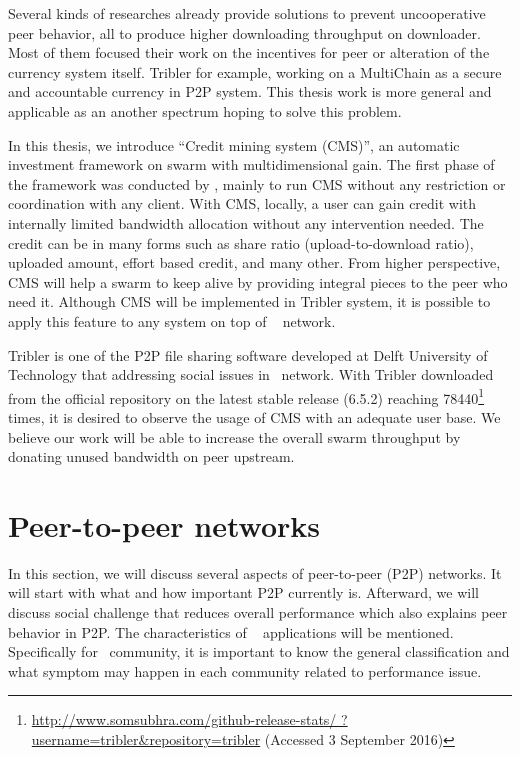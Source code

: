 Several kinds of researches already provide solutions to prevent uncooperative peer behavior, all to produce higher downloading throughput on downloader. Most of them focused their work on the incentives for peer or alteration of the currency system itself. Tribler for example, working on a MultiChain \cite{2015:multichain:norberhuis} as a secure and accountable currency in P2P system.  This thesis work is more general and applicable as an another spectrum hoping to solve this problem. 

In this thesis, we introduce ``Credit mining system (CMS)'', an automatic investment framework on swarm with multidimensional gain. The first phase of the framework was conducted by \citeauthor{2015:creditmining:capota}, mainly to run CMS without any restriction or coordination with any client. With CMS, locally, a user can gain credit with internally limited bandwidth allocation without any intervention needed. The credit can be in many forms such as share ratio (upload-to-download ratio), uploaded amount, effort based credit, and many other. From higher perspective, CMS will help a swarm to keep alive by providing integral pieces to the peer who need it. Although CMS will be implemented in Tribler system, it is possible to apply this feature to any system on top of \bt~ network.

Tribler is one of the P2P file sharing software developed at Delft University of Technology that addressing social issues in \bt~network\cite{2008:tribler:pouwelse}. With Tribler downloaded from the official repository on the latest stable release (6.5.2) reaching  78440\footnote{\url{http://www.somsubhra.com/github-release-stats/ ?username=tribler&repository=tribler} (Accessed 3 September 2016)} times, it is desired to observe the usage of CMS with an adequate user base. We believe our work will be able to increase the overall swarm throughput by donating unused bandwidth on peer upstream.


%


\section{Peer-to-peer networks}
In this section, we will discuss several aspects of peer-to-peer (P2P) networks. It will start with what and how important P2P currently is. Afterward, we will discuss social challenge that reduces overall performance which also explains peer behavior in P2P. The characteristics of \bt~ applications will be mentioned. Specifically for \bt~community, it is important to know the general classification and what symptom may happen in each community related to performance issue. 


